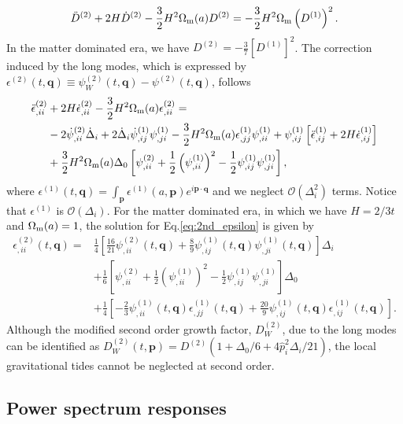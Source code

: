 \documentclass[a4paper,11pt]{article}
\newcommand{\vq}{{\bm q}}
\newcommand{\vp}{{\bm p}}
\begin{document}
\begin{align}
\ddot D^{(2)} + 2H \dot D^{(2)} - \frac32 H^2 \Omega_{\rm m}(a) D^{(2)} = -\frac32 H^2 \Omega_{\rm m}\left( D^{(1)} \right)^2.
\end{align}
In the matter dominated era, we have $D^{(2)}= -\frac37 \left[D^{(1)}\right]^2$.
The correction induced by the long modes, which is expressed by $\epsilon^{(2)}(t, \vq)\equiv \psi_W^{(2)}(t, \vq) - \psi^{(2)}(t, \vq)$, 
follows
\begin{align}
\ddot \epsilon^{(2)}_{,ii} &+ 2H \dot \epsilon^{(2)}_{,ii} - \frac32 H^2 \Omega_{\rm m}(a) \epsilon_{,ii}^{(2)}=
\nonumber\\
&-2\dot\psi^{(2)}_{,ii} \dot\Delta_i + 2\dot\Delta_i\dot\psi_{,ij}^{(1)}\psi_{,ji}^{(1)}
-\frac32 H^2 \Omega_{\rm m}(a) \epsilon^{(1)}_{,jj}\psi^{(1)}_{,ii} + \psi^{(1)}_{,ij} \left[ \ddot\epsilon_{,ij}^{(1)} + 2H\dot\epsilon_{,ij}^{(1)} \right]
\nonumber\\
&+\frac32 H^2 \Omega_{\rm m}(a)\Delta_0\left[ \psi_{,ii}^{(2)} + \frac12\left( \psi^{(1)}_{,ii}\right)^2- \frac12\psi^{(1)}_{,ij}\psi^{(1)}_{,ji} \right],
\label{eq:2nd_epsilon}
\end{align}
where $\epsilon^{(1)}(t,\vq) = \int_\vp \epsilon^{(1)}(a, \vp)e^{i\vp\cdot\vq}$
and we neglect $\mathcal{O}(\Delta_i^2)$ terms.
Notice that $\epsilon^{(1)}$ is $\mathcal{O}(\Delta_i)$.
For the matter dominated era, in which we have $H=2/3t$ and $\Omega_{\rm m}(a)=1$,
the solution for Eq.\eqref{eq:2nd_epsilon} is given by
\begin{align}
\epsilon^{(2)}_{,ii}(t, \vq)
=&\frac14 \left[\frac{16}{21}\psi^{(2)}_{,ii}(t,\vq) + \frac89\psi^{(1)}_{,ij}(t,\vq)\psi^{(1)}_{,ji}(t,\vq) \right]\Delta_i
\nonumber\\
&+\frac16 \left[\psi_{,ii}^{(2)} + \frac12\left( \psi^{(1)}_{,ii}\right)^2- \frac12\psi^{(1)}_{,ij}\psi^{(1)}_{,ji}   \right]\Delta_0
\nonumber\\
&+\frac14\left[-\frac23\psi^{(1)}_{,ii}(t,\vq)\epsilon_{,jj}^{(1)}(t,\vq) + \frac{20}{9}\psi^{(1)}_{,ij}(t,\vq)\epsilon_{,ij}^{(1)}(t,\vq)  \right].
\end{align}
Although the modified second order growth factor, $D^{(2)}_W$, due to the long modes can be identified as $D^{(2)}_W (t, \vp) = D^{(2)}(1 + \Delta_0/6 + 4\hat{p}_i^2\Delta_i/21 )$, the local gravitational tides cannot be neglected at second order.


\subsection{Power spectrum responses}
\label{sub:resp}
\end{document}
